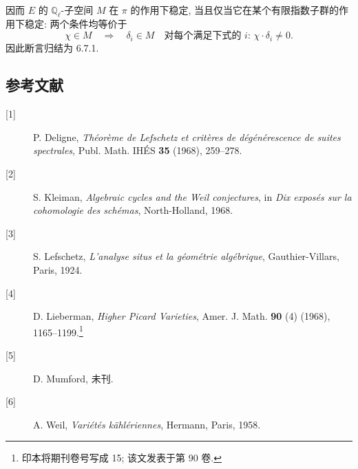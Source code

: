 因而 $E$ 的 $\mathbb Q_\ell$-子空间 $M$ 在 $\pi$ 的作用下稳定, 当且仅当它在某个有限指数子群的作用下稳定: 两个条件均等价于
\[
\chi\in M
\quad\Longrightarrow\quad
\delta_i\in M\quad\text{对每个满足下式的 $i$: }
\chi\cdot\delta_i\ne0.
\]
因此断言归结为 6.7.1.

\subsection*{参考文献}

\begin{description}
\item[{[1]}] P. Deligne, \emph{Théorème de Lefschetz et critères de
dégénérescence de suites spectrales}, Publ. Math. IHÉS \textbf{35}
(1968), 259--278.

\item[{[2]}] S. Kleiman, \emph{Algebraic cycles and the Weil
conjectures}, in \emph{Dix exposés sur la cohomologie des schémas},
North-Holland, 1968.

\item[{[3]}] S. Lefschetz, \emph{L'analyse situs et la géométrie
algébrique}, Gauthier-Villars, Paris, 1924.

\item[{[4]}] D. Lieberman, \emph{Higher Picard Varieties}, Amer. J.
Math. \textbf{90} (4) (1968), 1165--1199.\footnote{印本将期刊卷号写成 15; 该文发表于第 90 卷.}

\item[{[5]}] D. Mumford, 未刊.

\item[{[6]}] A. Weil, \emph{Variétés kählériennes}, Hermann, Paris,
1958.
\end{description}

